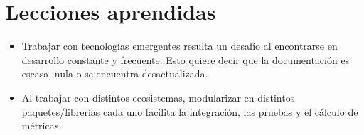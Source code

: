 \section{Lecciones aprendidas}

\begin{itemize}
    \item Trabajar con tecnologías emergentes resulta un desafío al encontrarse en desarrollo constante y frecuente. Esto quiere decir que la documentación es escasa, nula o se encuentra desactualizada.
    
    \item Al trabajar con distintos ecosistemas, modularizar en distintos paquetes/librerías cada uno facilita la integración, las pruebas y el cálculo de métricas.
    
\end{itemize}